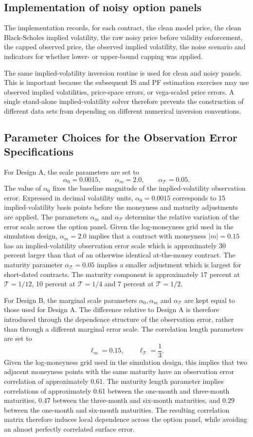 \documentclass[11pt,a4paper,notitlepage]{article}
\numberwithin{equation}{section}
\begin{document}
\subsection{Implementation of noisy option panels}
The implementation records, for each contract, the clean model price, the clean Black-Scholes implied volatility,
the raw noisy price before validity enforcement, the capped observed price, the observed implied
volatility, the noise scenario and indicators for whether lower- or upper-bound capping was applied.

The same implied-volatility inversion routine is used for clean and noisy panels. This is important because
the subsequent IS and PF estimation exercises may use observed implied volatilities, price-space errors, or
vega-scaled price errors. A single stand-alone implied-volatility solver therefore prevents the construction of
different data sets from depending on different numerical inversion conventions.

\subsection{Parameter Choices for the Observation Error Specifications}
For Design A, the scale parameters are set to
\[
\alpha_0=0.0015,\qquad \alpha_m=2.0,\qquad \alpha_{\mathcal T}=0.05.
\]
The value of $\alpha_0$ fixes the baseline magnitude of the implied-volatility observation error. Expressed in decimal volatility units, $\alpha_0=0.0015$ corresponds to 15 implied-volatility basis points before the moneyness and maturity adjustments are applied. The parameters $\alpha_m$ and $\alpha_{\mathcal T}$ determine the relative variation of the error scale across the option panel. Given the log-moneyness grid used in the simulation design, $\alpha_m=2.0$ implies that a contract with moneyness $|m|=0.15$ has an implied-volatility observation error scale which is approximately 30 percent larger than that of an otherwise identical at-the-money contract. The maturity parameter $\alpha_{\mathcal T}=0.05$ implies a smaller adjustment which is largest for short-dated contracts. The maturity component is approximately 17 percent at $\mathcal T=1/12$, 10 percent at $\mathcal T=1/4$ and 7 percent at $\mathcal T=1/2$.

For Design B, the marginal scale parameters $\alpha_0, \alpha_m$ and $\alpha_{\mathcal T}$ are kept equal to those used for Design A. The difference relative to Design A is therefore introduced through the dependence structure of the observation error, rather than through a different marginal error scale. The correlation length parameters are set to
\[
\ell_m=0.15,\qquad \ell_{\mathcal T}=\frac{1}{3}.
\]
Given the log-moneyness grid used in the simulation design, this implies that two adjacent moneyness points with the same maturity have an observation error correlation of approximately 0.61. The maturity length parameter implies correlations of approximately 0.61 between the one-month and three-month maturities, 0.47 between the three-month and six-month maturities, and 0.29 between the one-month and six-month maturities. The resulting correlation matrix therefore induces local dependence across the option panel, while avoiding an almost perfectly correlated surface error. 
\end{document}
